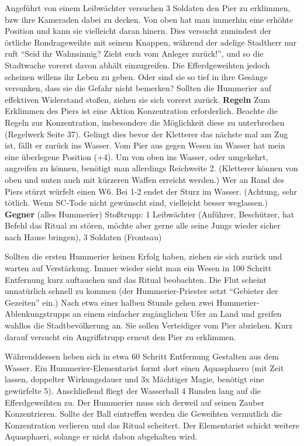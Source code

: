 Angeführt von einem Leibwächter versuchen 3 Soldaten den Pier zu erklimmen, bzw ihre Kameraden dabei zu decken. Von oben hat man immerhin eine erhöhte Position und kann sie vielleicht daran hinern. Dies versucht zumindest der örtliche Rondrageweihte mit seinem Knappen, während der adelige Stadtherr nur ruft \enquote{Seid ihr Wahnsinnig? Zieht euch vom Anleger zurück!}, und so die Stadtwache vorerst davon abhält einzugreifen. Die Efferdgeweihten jedoch scheinen willens ihr Leben zu geben. Oder sind sie so tief in ihre Gesänge versunken, dass sie die Gefahr nicht bemerken? Sollten die Hummerier auf effektiven Widerstand stoßen, ziehen sie sich vorerst zurück. 
\smallskip 
\newline 
\textbf{Regeln}
Zum Erklimmen des Piers ist eine Aktion Konzentration erforderlich. Beachte die Regeln zur Konzentration, insbesondere die Möglichkeit diese zu unterbrechen (Regelwerk Seite 37). Gelingt dies bevor der Kletterer das nächste mal am Zug ist, fällt er zurück ins Wasser. \newline
Vom Pier aus gegen Wesen im Wasser hat mein eine überlegene Position (+4). Um von oben ins Wasser, oder umgekehrt, angreifen zu können, benötigt man allerdings Reichweite 2. (Kletterer können von oben und unten auch mit kürzeren Waffen erreicht werden.) \newline
Wer an Rand des Piers stürzt würfelt einen W6. Bei 1-2 endet der Sturz im Wasser. (Achtung, sehr tötlich. Wenn SC-Tode nicht gewünscht sind, vielleicht besser weglassen.)
\smallskip 
\newline 
\textbf{Gegner} (alles Hummerier) \newline
Stoßtrupp: 1 Leibwächter (Anführer, Beschützer, hat Befehl das Ritual zu stören, möchte aber gerne alle seine Jungs wieder sicher nach Hause bringen), 3 Soldaten (Frontsau)

Sollten die ersten Hummerier keinen Erfolg haben, ziehen sie sich zurück und warten auf Verstärkung. Immer wieder sieht man ein Wesen in 100 Schritt Entfernung  kurz auftauchen und das Ritual beobachten. Die Flut scheint unnatürlich schnell zu kommen (der Hummerier-Priester setzt \enquote{Gebieter der Gezeiten} ein.) Nach etwa einer halben Stunde gehen zwei Hummerier-Ablenkungstrupps an einem einfacher zugänglichen Ufer an Land und greifen wahllos die Stadtbevölkerung an. Sie sollen Verteidiger vom Pier abziehen. Kurz darauf versucht ein Angriffstrupp erneut den Pier zu erklimmen. 

Währenddessen heben sich in etwa 60 Schritt Entfernung Gestalten aus dem Wasser. Ein Hummerier-Elementarist formt dort einen Aquasphaero (mit Zeit lassen, doppelter Wirkungsdauer und 3x Mächtiger Magie, benötigt eine gewürfelte 5). Anschließend fliegt der Wasserball 4 Runden lang auf die Efferdgeweihten zu. Der Hummerier muss sich derweil auf seinen Zauber Konzentrieren. Sollte der Ball eintreffen werden die Geweihten vermutlich die Konzentration verlieren und das Ritual scheitert. Der Elementarist schickt weitere Aquasphaeri, solange er nicht dabon abgehalten wird.

